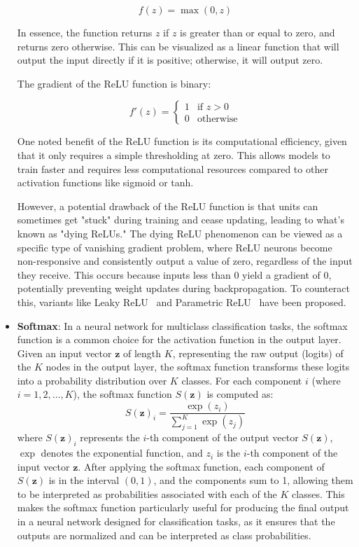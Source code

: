\begin{itemize}
\[
f(z) = \max(0, z)
\]

In essence, the function returns \( z \) if \( z \) is greater than or equal to zero, and returns zero otherwise. This can be visualized as a linear function that will output the input directly if it is positive; otherwise, it will output zero.

The gradient of the ReLU function is binary:

\[
f'(z) = 
\begin{cases} 
1 & \text{if } z > 0 \\
0 & \text{otherwise}
\end{cases}
\]

One noted benefit of the ReLU function is its computational efficiency, given that it only requires a simple thresholding at zero. This allows models to train faster and requires less computational resources compared to other activation functions like sigmoid or tanh.

However, a potential drawback of the ReLU function is that units can sometimes get "stuck" during training and cease updating, leading to what's known as "dying ReLUs." The dying ReLU phenomenon can be viewed as a specific type of vanishing gradient problem, where ReLU neurons become non-responsive and consistently output a value of zero, regardless of the input they receive. This occurs because inputs less than 0 yield a gradient of 0, potentially preventing weight updates during backpropagation. To counteract this, variants like Leaky ReLU~\cite{maas2013rectifier} and Parametric ReLU~\cite{he2015delving} have been proposed.
\item \textbf{Softmax}:
In a neural network for multiclass classification tasks, the softmax function is a common choice for the activation function in the output layer. Given an input vector \( \mathbf{z} \) of length \( K \), representing the raw output (logits) of the \( K \) nodes in the output layer, the softmax function transforms these logits into a probability distribution over \( K \) classes. For each component \( i \) (where \( i = 1, 2, \ldots, K \)), the softmax function \( S(\mathbf{z}) \) is computed as:
\[
S(\mathbf{z})_i = \frac{{\exp(z_i)}}{{\sum_{j=1}^{K} \exp(z_j)}}
\]
where \( S(\mathbf{z})_i \) represents the \( i \)-th component of the output vector \( S(\mathbf{z}) \), \( \exp \) denotes the exponential function, and \( z_i \) is the \( i \)-th component of the input vector \( \mathbf{z} \). After applying the softmax function, each component of \( S(\mathbf{z}) \) is in the interval \( (0, 1) \), and the components sum to 1, allowing them to be interpreted as probabilities associated with each of the \( K \) classes. This makes the softmax function particularly useful for producing the final output in a neural network designed for classification tasks, as it ensures that the outputs are normalized and can be interpreted as class probabilities.

\end{itemize}

